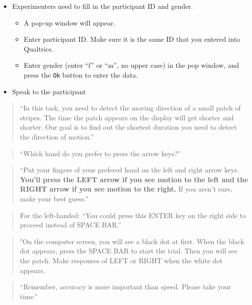 \documentclass[]{article}
\providecommand{\tightlist}{%
  \setlength{\itemsep}{0pt}\setlength{\parskip}{0pt}}
\begin{document}
\begin{itemize}
\tightlist
\item
  Experimenters need to fill in the participant ID and gender.

  \begin{itemize}
  \tightlist
  \item
    A pop-up window will appear.
  \item
    Enter participant ID. Make sure it is the same ID that you entered
    into Qualtrics.
  \item
    Enter gender (enter ``f'' or ``m'', no upper case) in the pop
    window, and press the \texttt{Ok} button to enter the data.
  \end{itemize}
\item
  Speak to the participant
\end{itemize}

\begin{quote}
``In this task, you need to detect the moving direction of a small patch
of stripes. The time the patch appears on the display will get shorter
and shorter. Our goal is to find out the shortest duration you need to
detect the direction of motion.''
\end{quote}

\begin{quote}
``Which hand do you prefer to press the arrow keys?''
\end{quote}

\begin{quote}
``Put your fingers of your prefered hand on the left and right arrow
keys. \textbf{You'll press the LEFT arrow if you see motion to the left
and the RIGHT arrow if you see motion to the right.} If you aren't sure,
make your best guess.''
\end{quote}

\begin{quote}
For the left-handed: ``You could press this ENTER key on the right side
to proceed instead of SPACE BAR.''
\end{quote}

\begin{quote}
"On the computer screen, you will see a black dot at first. When the
black dot appears, press the SPACE BAR to start the trial. Then you will
see the patch. Make responses of LEFT or RIGHT when the white dot
appears.
\end{quote}

\begin{quote}
``Remember, accuracy is more important than speed. Please take your
time.''
\end{quote}
\end{document}
